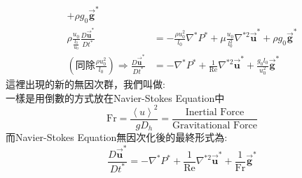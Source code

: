 \documentclass[../main.tex]{subfiles}
\begin{document}
\begin{itemize}
\begin{itemize}
\begin{align}
      + \rho g_0 \vec{\bm g}^\ast \nonumber\\
      \rho \frac{u_0}{\frac{l_0}{u_0}} \frac{D \vec {\bm u}^\ast}{D t^\ast} &=
      -\frac{\rho u_0^2}{l_0} \nabla^\ast P^\ast
      + \mu \frac{u_0}{l_0^2} \nabla^{\ast 2} \vec {\bm u}^\ast
      + \rho g_0 \vec{\bm g}^\ast \nonumber\\
      (\text{同除}\frac{\rho u_0^2}{l_0}) \Rightarrow
      \frac{D \vec {\bm u}^\ast}{D t^\ast} &=
      - \nabla^\ast P^\ast
      + \frac{1}{\text{Re}} \nabla^{\ast 2} \vec {\bm u}^\ast
      + \frac{g_0 l_0}{u_0^2} \vec{\bm g}^\ast 
    \end{align}
    這裡出現的新的無因次群，我們叫做:\\
    一樣是用倒數的方式放在Navier-Stokes Equation中
    \begin{equation}
      \text{Fr} = \frac{\left<u\right>^2}{g D_h} = \frac{\text{Inertial Force}}{\text{Gravitational Force}}
    \end{equation}
    而Navier-Stokes Equation無因次化後的最終形式為:
    \begin{equation}
      \frac{D \vec {\bm u}^\ast}{D t^\ast} =
      - \nabla^\ast P^\ast
      + \frac{1}{\text{Re}} \nabla^{\ast 2} \vec {\bm u}^\ast
      + \frac{1}{\text{Fr}} \vec{\bm g}^\ast 
    \end{equation}
  \end{itemize}
\end{itemize}
\end{document}
